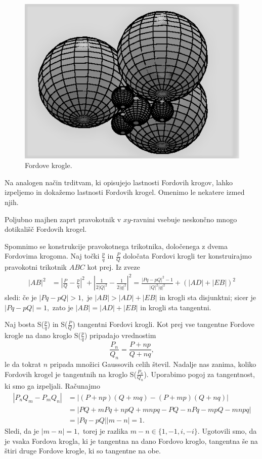 \documentclass[mat1]{fmfdelo}
\begin{document}
\begin{figure}[h!]
\begin{center}
\includegraphics[scale=1]{fordove_krogle1.png}
\caption{Fordove krogle.}
\end{center}
\end{figure}

Na analogen način trditvam, ki opisujejo lastnosti Fordovih krogov, lahko izpeljemo in dokažemo lastnosti Fordovih krogel. Omenimo le nekatere izmed njih.

Poljubno majhen zaprt pravokotnik v $xy$-ravnini vsebuje neskončno mnogo dotikališč Fordovih krogel.

Spomnimo se konstrukcije pravokotnega trikotnika, določenega z dvema Fordovima krogoma. Naj točki $\frac{p}{q}$ in $\frac{P}{Q}$ določata Fordovi krogli ter konstruirajmo pravokotni trikotnik $ABC$ kot prej. Iz zveze
\begin{align*}
|AB|^2 
  &= \left |\frac{P}{Q} - \frac{p}{q} \right|^2 + \left |\frac{1}{2|Q|^2} - \frac{1}{2|q|^2} \right|^2 = \frac{|Pq-pQ|^2-1}{|Q|^2|q|^2} + (|AD| + |EB|)^2
\end{align*}
sledi:
če je $|Pq-pQ|>1,$ je $|AB|>|AD|+|EB|$ in krogli sta disjunktni;
sicer je $|Pq-pQ|=1,$ zato je $|AB|=|AD|+|EB|$ in krogli sta tangentni.

Naj bosta S($\frac{p}{q}$) in S($\frac{P}{Q}$) tangentni Fordovi krogli. Kot prej vse tangentne Fordove krogle na dano kroglo S($\frac{p}{q}$) pripadajo vrednostim
\begin{equation}
\frac{P_n}{Q_n} = \frac{P+np}{Q+nq},
\end{equation}
le da tokrat $n$ pripada množici Gaussovih celih števil. 
Nadalje nas zanima, koliko Fordovih krogel je tangentnih na kroglo S($\frac{P_n}{Q_n}$).
Uporabimo pogoj za tangentnost, ki smo ga izpeljali. Računajmo
\begin{align} 
|P_{n}Q_{m} - P_{m}Q_{n}| 
  &= |(P+np)(Q+mq) - (P+mp)(Q+nq)| \nonumber \\
  &= |PQ+mPq+npQ+mnpq-PQ-nPq-mpQ-mnpq| \nonumber \\
  &= |Pq-pQ| |m-n| = 1.
\end{align}
%
Sledi, da je $|m-n|=1,$ torej je razlika $m-n \in \{1, -1, i, -i \}.$ Ugotovili smo, da je vsaka Fordova krogla, ki je tangentna na dano Fordovo kroglo, tangentna še na štiri druge Fordove krogle, ki so tangentne na obe.
\end{document}
